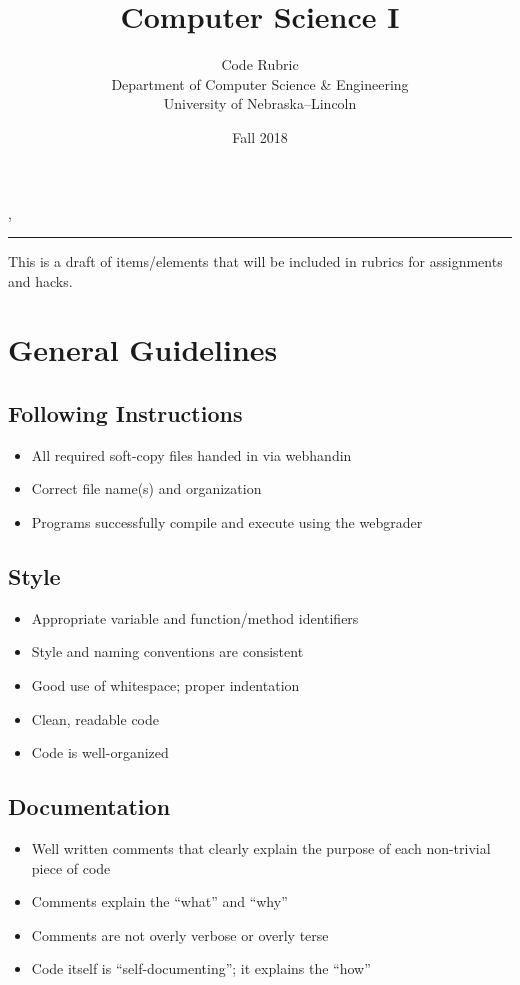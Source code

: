 \documentclass[12pt]{scrartcl}
\title{Computer Science I}\let\Title\@title
\subtitle{Code Rubric\\
{\small
\vskip1cm
Department of Computer Science \& Engineering \\
University of Nebraska--Lincoln}
\vskip-1cm}
\date{Fall 2018}
\begin{document}
\maketitle

\newwatermark[allpages=true,scale=5,textmark=Draft\\Draft\\Draft\\Draft,color=gray!15,]{},

\hrule

This is a draft of items/elements that will be included in rubrics for
assignments and hacks.

\section*{General Guidelines}

\subsection*{Following Instructions}
\begin{itemize}
  \item All required soft-copy files handed in via webhandin
  \item Correct file name(s) and organization
  \item Programs successfully compile and execute using the webgrader
\end{itemize}

\subsection*{Style}
\begin{itemize}
  \item Appropriate variable and function/method identifiers
  \item Style and naming conventions are consistent
  \item Good use of whitespace; proper indentation
  \item Clean, readable code
  \item Code is well-organized
\end{itemize}

\subsection*{Documentation}
\begin{itemize}
  \item Well written comments that clearly explain the purpose of each non-trivial piece of code
  \item Comments explain the ``what'' and ``why''
  \item Comments are not overly verbose or overly terse
  \item Code itself is ``self-documenting''; it explains the ``how''
\end{itemize}
\end{document}
